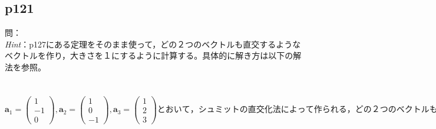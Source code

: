 \documentclass[dvipdfmx,uplatex,11pt]{jsarticle}
\begin{document}
\subsection{p121}
問：\\
\textsl{Hint}：p127にある定理をそのまま使って，どの２つのベクトルも直交するようなベクトルを作り，大きさを１にするように計算する。具体的に解き方は以下の解法を参照。\\
\dotfill \\ \\
$\bm{a}_1=
\begin{pmatrix}
1 \\
-1 \\
0
\end{pmatrix}
,\bm{a}_2=
\begin{pmatrix}
1 \\
0 \\
-1
\end{pmatrix}
,\bm{a}_3=
\begin{pmatrix}
1 \\
2 \\
3
\end{pmatrix}
とおいて，シュミットの直交化法によって作られる，どの２つのベクトルも直交するようなベクトルを\bm{b}_1, \bm{b}_2, \bm{b}_3 ，正規直交基底を\bm{c}_1, \bm{c}_2, \bm{c}_3 とする。$
\end{document}
